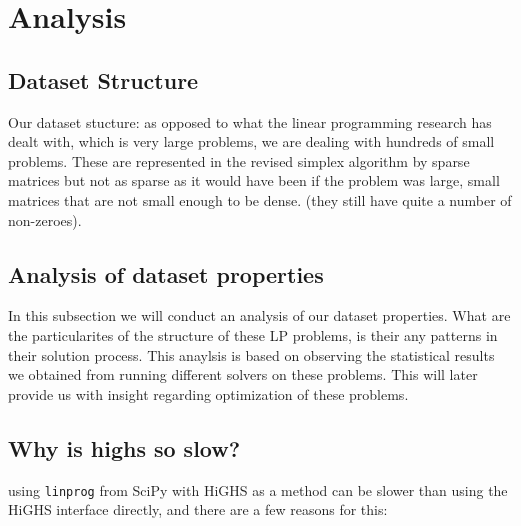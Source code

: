 \section{Analysis}

\subsection{Dataset Structure}
Our dataset stucture:
as opposed to what the linear programming research has dealt with, which is
very large problems, we are dealing with hundreds of small problems. These are represented
in the revised simplex algorithm by
sparse matrices but not as sparse as it would have been if the problem was large,
small matrices that are not small enough to be dense.
(they still have quite a number of non-zeroes).

\subsection{Analysis of dataset properties}
In  this subsection we will conduct an analysis of our dataset properties. What are the
particularites of the structure of these LP problems, is their any patterns in their solution
process. This anaylsis is based on observing the statistical results we obtained from
running different solvers on these problems. This will later provide us with insight
regarding optimization of these problems.
\subsection{Why is highs so slow?}
using \texttt{linprog} from SciPy with HiGHS as a method can be slower than using the HiGHS interface directly, and there are a few reasons for this:

